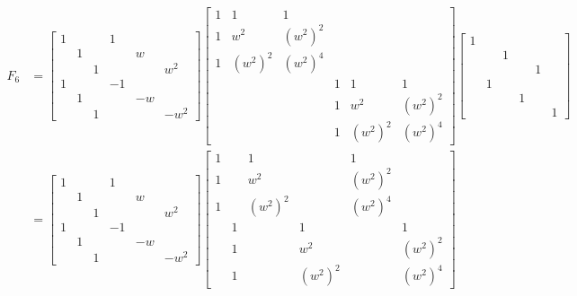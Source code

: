 \documentclass[a4paper]{article}
\begin{document}
{\footnotesize
\begin{align*}
	F_{6} & = \begin{bmatrix}
		1 &  &  & 1 &  & \\
		 & 1 &  &  & w & \\
		 &  & 1 &  &  & w^{2} \\
		1 &  &  & -1 &  & \\
		 & 1 &  &  & -w & \\
		 &  & 1 &  &  & -w^{2}
	\end{bmatrix} 
	\begin{bmatrix}
		1 & 1 & 1 &  &  & \\
		1 & w^{2} & \!\left( w^{2} \right)^{2} &  &  & \\
		1 & \!\left( w^{2} \right)^{2} & \!\left( w^{2} \right)^{4} &  &  & \\
		 &  &  & 1 & 1 & 1 \\
		 &  &  & 1 & w^{2} & \!\left( w^{2} \right)^{2} \\
		 &  &  & 1 & \!\left( w^{2} \right)^{2} & \!\left( w^{2} \right)^{4}
	\end{bmatrix}
	\begin{bmatrix}
		1 &  &  &  &  & \\
		 &  & 1 &  &  & \\
		 &  &  &  & 1 & \\
		 & 1 &  &  &  & \\
		 &  &  & 1 &  & \\
		 &  &  &  &  & 1
	\end{bmatrix} \\
	 & = 
	 \begin{bmatrix}
		1 &  &  & 1 &  & \\
		 & 1 &  &  & w & \\
		 &  & 1 &  &  & w^{2} \\
		1 &  &  & -1 &  & \\
		 & 1 &  &  & -w & \\
		 &  & 1 &  &  & -w^{2}
	\end{bmatrix}
	 \begin{bmatrix}
	 	1 &  & 1 &  & 1 & \\
	 	1 &  & w^{2} &  & \!\left( w^{2} \right)^{2} & \\
	 	1 &  & \!\left( w^{2} \right)^{2} &  & \!\left( w^{2} \right)^{4} & \\
	 	 & 1 &  & 1 &  & 1 \\
	 	 & 1 &  & w^{2} &  & \!\left( w^{2} \right)^{2} \\
	 	 & 1 &  & \!\left( w^{2} \right)^{2} &  & \!\left( w^{2} \right)^{4}

\end{bmatrix}
\end{align*}}
\end{document}
